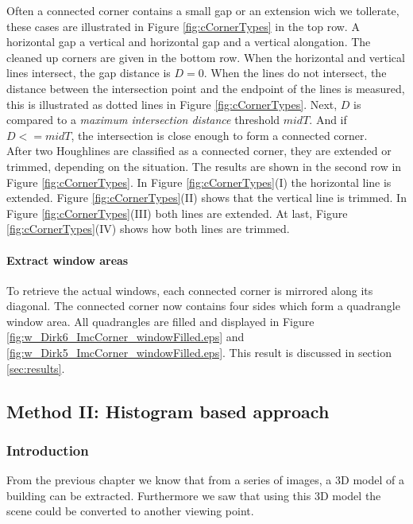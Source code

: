Often a connected corner contains a small gap or an extension wich we tollerate,
these cases are illustrated in Figure \ref{fig:cCornerTypes} in the top row.
A horizontal gap a vertical and horizontal gap and a vertical alongation. The
cleaned up corners are given in the bottom row.  When the horizontal and
vertical lines intersect, the gap distance is $D=0$.  When the lines do not
intersect, the distance between the intersection point and the endpoint of the
lines is measured, this is illustrated as dotted lines in Figure
\ref{fig:cCornerTypes}.  Next, $D$ is compared to a \emph{maximum intersection
distance} threshold $midT$.  And if $D<=midT$, the intersection is close enough
to form a connected corner.\\

After two Houghlines are classified as a connected corner, they are extended or
trimmed, depending on the situation. The results are shown in the second row in
Figure \ref{fig:cCornerTypes}.
In Figure \ref{fig:cCornerTypes}(I)  the horizontal line is extended.  Figure
\ref{fig:cCornerTypes}(II) shows that the vertical line is trimmed.  In Figure
\ref{fig:cCornerTypes}(III) both lines are extended.  At last, Figure
\ref{fig:cCornerTypes}(IV) shows how both lines are trimmed.


\paragraph{Extract window areas}
To retrieve the actual windows, each connected corner is mirrored along its
diagonal. The connected corner now contains four sides which form a 
quadrangle window area.
All quadrangles are filled and displayed in Figure
\ref{fig:w_Dirk6_ImcCorner_windowFilled.eps} and
\ref{fig:w_Dirk5_ImcCorner_windowFilled.eps}. This result is discussed in section
\ref{sec:results}.


\subsection{Method II: Histogram based approach} 
\subsubsection{Introduction}
From the previous chapter we know that from a series of images, a 3D model of a
building can be extracted. Furthermore we saw that using this 3D model the
scene could be converted to another viewing point. 

